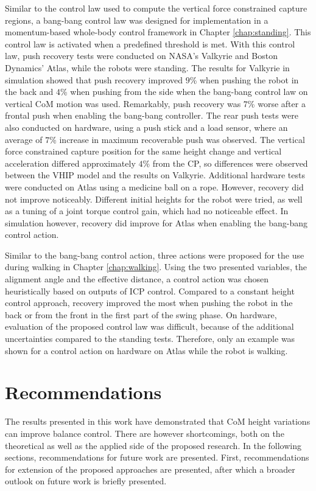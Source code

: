 Similar to the control law used to compute the vertical force constrained capture regions, a bang-bang control law was designed for implementation in a momentum-based whole-body control framework in Chapter \ref{chap:standing}. This control law is activated when a predefined threshold is met. With this control law, push recovery tests were conducted on NASA's Valkyrie and Boston Dynamics' Atlas, while the robots were standing. The results for Valkyrie in simulation showed that push recovery improved $9$\% when pushing the robot in the back and $4$\% when pushing from the side when the bang-bang control law on vertical \ac{CoM} motion was used. Remarkably, push recovery was $7$\% worse after a frontal push when enabling the bang-bang controller. The rear push tests were also conducted on hardware, using a push stick and a load sensor, where an average of $7$\% increase in maximum recoverable push was observed. The vertical force constrained capture position for the same height change and vertical acceleration differed approximately $4$\% from the \ac{CP}, so differences were observed between the \ac{VHIP} model and the results on Valkyrie. Additional hardware tests were conducted on Atlas using a medicine ball on a rope. However, recovery did not improve noticeably. Different initial heights for the robot were tried, as well as a tuning of a joint torque control gain, which had no noticeable effect. In simulation however, recovery did improve for Atlas when enabling the bang-bang control action.

Similar to the bang-bang control action, three actions were proposed for the use during walking in Chapter \ref{chap:walking}. Using the two presented variables, the alignment angle and the effective distance, a control action was chosen heuristically based on outputs of \ac{ICP} control. Compared to a constant height control approach, recovery improved the most when pushing the robot in the back or from the front in the first part of the swing phase. On hardware, evaluation of the proposed control law was difficult, because of the additional uncertainties compared to the standing tests. Therefore, only an example was shown for a control action on hardware on Atlas while the robot is walking.

\section{Recommendations}
The results presented in this work have demonstrated that \ac{CoM} height variations can improve balance control. There are however shortcomings, both on the theoretical as well as the applied side of the proposed research. In the following sections, recommendations for future work are presented. First, recommendations for extension of the proposed approaches are presented, after which a broader outlook on future work is briefly presented.
